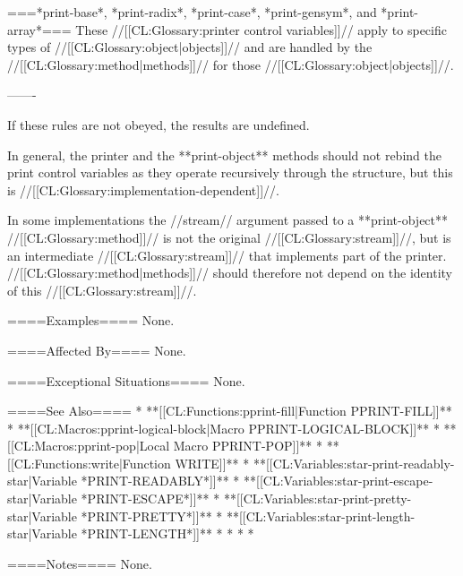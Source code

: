 ===*print-base*, *print-radix*, *print-case*, *print-gensym*, and *print-array*===
These //[[CL:Glossary:printer control variables]]// apply to specific types of //[[CL:Glossary:object|objects]]// and are handled by the //[[CL:Glossary:method|methods]]// for those //[[CL:Glossary:object|objects]]//.

-------

If these rules are not obeyed, the results are undefined.

In general, the printer and the **print-object** methods should not rebind the print control variables as they operate recursively through the structure, but this is //[[CL:Glossary:implementation-dependent]]//.

In some implementations the //stream// argument passed to a **print-object** //[[CL:Glossary:method]]// is not the original //[[CL:Glossary:stream]]//, but is an intermediate //[[CL:Glossary:stream]]// that implements part of the printer. //[[CL:Glossary:method|methods]]// should therefore not depend on the identity of this //[[CL:Glossary:stream]]//.

====Examples====
None.

====Affected By====
None.

====Exceptional Situations====
None.

====See Also====
  * **[[CL:Functions:pprint-fill|Function PPRINT-FILL]]**
  * **[[CL:Macros:pprint-logical-block|Macro PPRINT-LOGICAL-BLOCK]]**
  * **[[CL:Macros:pprint-pop|Local Macro PPRINT-POP]]**
  * **[[CL:Functions:write|Function WRITE]]**
  * **[[CL:Variables:star-print-readably-star|Variable *PRINT-READABLY*]]**
  * **[[CL:Variables:star-print-escape-star|Variable *PRINT-ESCAPE*]]**
  * **[[CL:Variables:star-print-pretty-star|Variable *PRINT-PRETTY*]]**
  * **[[CL:Variables:star-print-length-star|Variable *PRINT-LENGTH*]]**
  * {\secref\DefaultPrintObjMeths}
  * {\secref\PrintingStructures}
  * {\secref\PPrintDispatchTables}
  * {\secref\PrettyPrinterExamples}

====Notes====
None.

        
